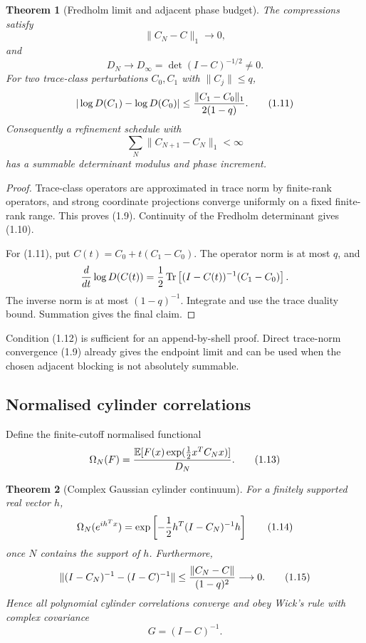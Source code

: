 \documentclass[11pt]{article}
\newtheorem{theorem}{Theorem}[section]
\theoremstyle{remark}
\begin{document}
\begin{theorem}[Fredholm limit and adjacent phase budget]
\label{thm:v12v1-fredholm}
The compressions satisfy
\[
                              \|C_N-C\|_1\longrightarrow0,   \tag{1.9}
\]
and
\[
 D_N\longrightarrow
 D_\infty=\det(I-C)^{-1/2}\ne0.                             \tag{1.10}
\]
For two trace-class perturbations \(C_0,C_1\) with
\(\|C_j\|\le q\),
\[
 |\log D(C_1)-\log D(C_0)|
 \le{\|C_1-C_0\|_1\over2(1-q)}.                             \tag{1.11}
\]
Consequently a refinement schedule with
\[
                              \sum_N\|C_{N+1}-C_N\|_1<\infty \tag{1.12}
\]
has a summable determinant modulus and phase increment.
\end{theorem}

\begin{proof}
Trace-class operators are approximated in trace norm by finite-rank
operators, and strong coordinate projections converge uniformly on a
fixed finite-rank range.  This proves (1.9).  Continuity of the
Fredholm determinant gives (1.10).

For (1.11), put \(C(t)=C_0+t(C_1-C_0)\).  The operator norm is at most
\(q\), and
\[
 {d\over dt}\log D(C(t))
 ={1\over2}\operatorname{Tr}
   \left[(I-C(t))^{-1}(C_1-C_0)\right].
\]
The inverse norm is at most \((1-q)^{-1}\).  Integrate and use the
trace duality bound.  Summation gives the final claim.
\end{proof}

Condition (1.12) is sufficient for an append-by-shell proof.  Direct
trace-norm convergence (1.9) already gives the endpoint limit and can
be used when the chosen adjacent blocking is not absolutely
summable.

\subsection{Normalised cylinder correlations}

Define the finite-cutoff normalised functional
\[
 \Omega_N(F)
 ={ \mathbb E[
       F(x)\exp(\frac12x^TC_Nx)]\over D_N}.                  \tag{1.13}
\]

\begin{theorem}[Complex Gaussian cylinder continuum]
\label{thm:v12v1-cylinder}
For a finitely supported real vector \(h\),
\[
 \Omega_N(e^{ih^Tx})
 =\exp\left[
 -{1\over2}h^T(I-C_N)^{-1}h
 \right]                                                     \tag{1.14}
\]
once \(N\) contains the support of \(h\).  Furthermore,
\[
 \|(I-C_N)^{-1}-(I-C)^{-1}\|
 \le{\|C_N-C\|\over(1-q)^2}\longrightarrow0.                \tag{1.15}
\]
Hence all polynomial cylinder correlations converge and obey Wick's
rule with complex covariance
\[
                                      G=(I-C)^{-1}.           \tag{1.16}
\]
\end{theorem}
\end{document}
